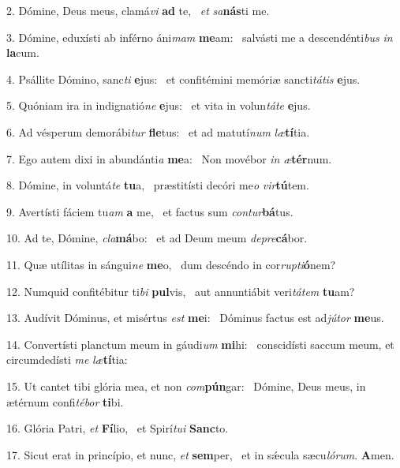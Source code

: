 2. Dómine, Deus meus, clamá\textit{vi} \textbf{ad} te, \ast\  \textit{et} \textit{sa}\textbf{nás}ti me.\

3. Dómine, eduxísti ab inférno áni\textit{mam} \textbf{me}am: \ast\  salvásti me a descendénti\textit{bus} \textit{in} \textbf{la}cum.\

4. Psállite Dómino, sanc\textit{ti} \textbf{e}jus: \ast\  et confitémini memóriæ sancti\textit{tá}\textit{tis} \textbf{e}jus.\

5. Quóniam ira in indignatió\textit{ne} \textbf{e}jus: \ast\  et vita in volun\textit{tá}\textit{te} \textbf{e}jus.\

6. Ad vésperum demorábi\textit{tur} \textbf{fle}tus: \ast\  et ad matutí\textit{num} \textit{læ}\textbf{tí}tia.\

7. Ego autem dixi in abundánti\textit{a} \textbf{me}a: \ast\  Non movébor \textit{in} \textit{æ}\textbf{tér}num.\

8. Dómine, in voluntá\textit{te} \textbf{tu}a, \ast\  præstitísti decóri me\textit{o} \textit{vir}\textbf{tú}tem.\

9. Avertísti fáciem tu\textit{am} \textbf{a} me, \ast\  et factus sum \textit{con}\textit{tur}\textbf{bá}tus.\

10. Ad te, Dómine, \textit{cla}\textbf{má}bo: \ast\  et ad Deum meum \textit{de}\textit{pre}\textbf{cá}bor.\

11. Quæ utílitas in sángui\textit{ne} \textbf{me}o, \ast\  dum descéndo in cor\textit{rup}\textit{ti}\textbf{ó}nem?\

12. Numquid confitébitur ti\textit{bi} \textbf{pul}vis, \ast\  aut annuntiábit veri\textit{tá}\textit{tem} \textbf{tu}am?\

13. Audívit Dóminus, et misértus \textit{est} \textbf{me}i: \ast\  Dóminus factus est ad\textit{jú}\textit{tor} \textbf{me}us.\

14. Convertísti planctum meum in gáudi\textit{um} \textbf{mi}hi: \ast\  conscidísti saccum meum, et circumdedísti \textit{me} \textit{læ}\textbf{tí}tia:\

15. Ut cantet tibi glória mea, et non \textit{com}\textbf{pún}gar: \ast\  Dómine, Deus meus, in ætérnum confi\textit{té}\textit{bor} \textbf{ti}bi.\

16. Glória Patri, \textit{et} \textbf{Fí}lio, \ast\  et Spirí\textit{tu}\textit{i} \textbf{Sanc}to.\

17. Sicut erat in princípio, et nunc, \textit{et} \textbf{sem}per, \ast\  et in sǽcula sæcu\textit{ló}\textit{rum}. \textbf{A}men.\

